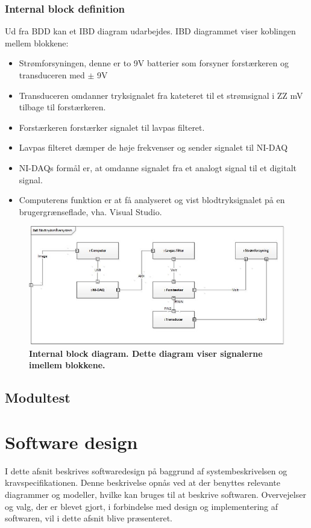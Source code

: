 \subsubsection{Internal block definition}
Ud fra BDD kan et IBD diagram udarbejdes. IBD diagrammet viser koblingen mellem blokkene:
\begin{itemize}
\item Strømforsyningen, denne er to 9V batterier som forsyner forstærkeren og transduceren med $\pm$ 9V
\item Transduceren omdanner tryksignalet fra kateteret til et strømsignal i ZZ mV tilbage til forstærkeren.
\item Forstærkeren forstærker signalet til lavpas filteret.
\item Lavpas filteret dæmper de høje frekvenser og sender signalet til NI-DAQ
\item NI-DAQs formål er, at omdanne signalet fra et analogt signal til et digitalt signal.
\item Computerens funktion er at få analyseret og vist blodtryksignalet på en brugergrænseflade, vha. Visual Studio. 
\end{itemize}
\begin{figure}[H]
\includegraphics[width =1.0\textwidth , center]{billeder/IBD}
\caption{\textbf{Internal block diagram. Dette diagram viser signalerne imellem blokkene.}}
\end{figure}

\subsection{Modultest}
\section{Software design}
I dette afsnit beskrives softwaredesign på baggrund af systembeskrivelsen og kravspecifikationen. Denne beskrivelse opnås ved at der benyttes relevante diagrammer og modeller, hvilke kan bruges til at beskrive softwaren. Overvejelser og valg, der er blevet gjort, i forbindelse med design og implementering af softwaren, vil i dette afsnit blive præsenteret.
